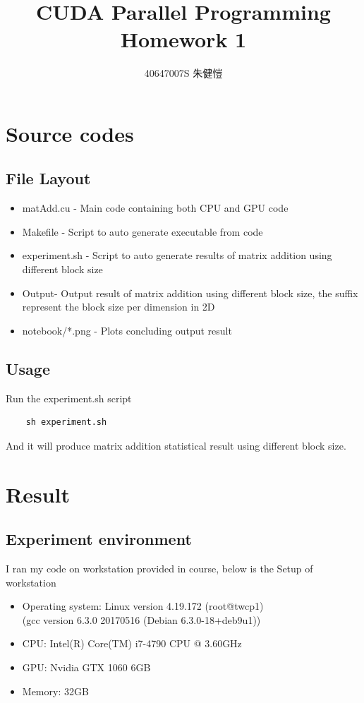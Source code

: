 \documentclass{article}
\title{CUDA Parallel Programming\\Homework 1}
\author{40647007S 朱健愷}
\begin{document}
	\maketitle
	\section{Source codes}
	\subsection{File Layout}
	\begin{itemize}
		\item matAdd.cu - Main code containing both CPU and GPU code
		\item Makefile - Script to auto generate executable from code
		\item experiment.sh - Script to auto generate results of matrix addition using different block size
		\item Output\textunderscore* - Output result of matrix addition using different block size, the suffix represent the block size per dimension in 2D
		\item notebook/*.png - Plots concluding output result
	\end{itemize}
	
	
	\subsection{Usage}
	Run the experiment.sh script
	
	\begin{verbatim}
	sh experiment.sh
	\end{verbatim}
	
	And it will produce matrix addition statistical result using different block size.
	\section{Result}
	\subsection{Experiment environment}
	I ran my code on workstation provided in course, below is the Setup of workstation
	\begin{itemize}
		\item Operating system: Linux version 4.19.172 (root@twcp1)\\(gcc version 6.3.0 20170516 (Debian 6.3.0-18+deb9u1))
		\item CPU: Intel(R) Core(TM) i7-4790 CPU @ 3.60GHz
		\item GPU: Nvidia GTX 1060 6GB
		\item Memory: 32GB 
	\end{itemize}
\end{document}
